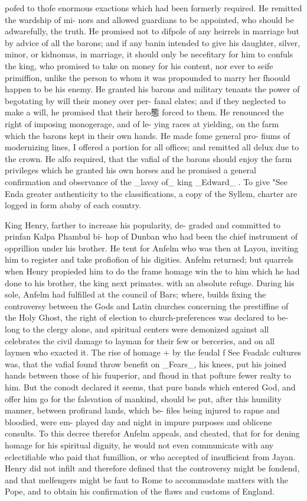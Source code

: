 \documentclass{article}
\begin{document}
pofed to thofe enormous exactions which had been formerly required. He remitted the wardship of mi- nors and allowed guardians to be appointed, who should be adwarefully, the truth. He promised not to difpole of any heirrels in marriage but by advice of all the barons; and if any banin intended to give his daughter, silver, minor, or kidnomas, in marriage, it should only be necefitary for him to confuls the king, who promised to take on money for his content, nor ever to seife primiffion, unlike the person to whom it was propounded to marry her fhoould happen to be his enemy. He granted his barons and military tenants the power of begotating by will their money over per- fanal elates; and if they neglected to make a will, he promised that their hero態 forced to them. He renounced the right of imposing monogerage, and of le- ying races at yielding, on the farm which the barons kept in their own hands. He made fome general pro- fiums of modernizing lines, I offered a portion for all offices; and remitted all delux due to the crown. He alfo required, that the vafial of the barons should enjoy the farm privileges which he granted his own horses and he promised a general confirmation and observance of the \_lavsy of\_ king \_Edward\_ . To give "See Enda greater authenticity to the classifications, a copy of the Syllem, charter are logged in form ababy of each country.

King Henry, farther to increase his popularity, de- graded and committed to prinfan Kalpa Phambul bi- hop of Dunban who had been the chief instrument of opprillion under his brother. He tent for Anfelm who was then at Layou, inviting him to register and take profiofion of his digities. Anfelm returned; but quarrels when Henry propieded him to do the frame homage win the to him which he had done to his brother, the king next primates. with an absolute refuge. During his sole, Anfelm had fulfilled at the council of Bars; where, builds fixing the controversy between the Gods and Latin churches concerning the prestiffine of the Holy Ghost, the right of election to church-preferences was declared to be- long to the clergy alone, and spiritual centers were demonized against all celebrates the civil damage to layman for their few or berceries, and on all laymen who exacted it. The rise of homage + by the feudal f See Feadalc cultures was, that the vafial found throw benefit on \_Fears\_, his knees, put his joined hands between those of his fuuperior, and fhoud in that pofture fewer realty to him. But the conodt declared it seems, that pure bands which entered God, and offer him go for the falsvation of mankind, should be put, after this humility manner, between profirand lands, which be- files being injured to rapne and bloodied, were em- played day and night in impure purposes and oblicene consults. To this decree therefor Anfelm appeals, and cheated, that for for dening homage for his spiritual dignity, he would not even communicate with any eclectifiable who paid that fumillion, or who accepted of insufficient from Jayan. Henry did not infilt and therefore defined that the controversy might be fondend, and that melfengers might be faut to Rome to accommodate matters with the Pope, and to obtain his confirmation of the flaws and customs of England.
\end{document}
